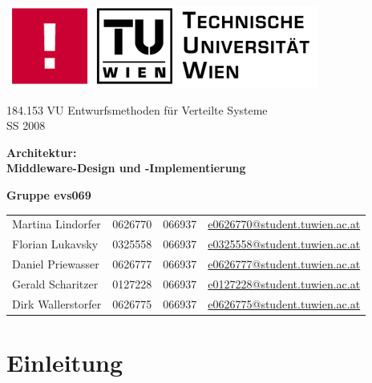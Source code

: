 \documentclass[a4paper,11pt]{article}
\begin{document}
\begin{titlepage}
	\bigskip
	\bigskip
	\bigskip
	\begin{center}
		\includegraphics{images/img_tuwien.png}
		
		\vspace{3cm}

		\LARGE{\textsf{184.153 VU Entwurfsmethoden f\"{u}r Verteilte Systeme\\SS 2008}}
			
		\vspace{1.5cm}
		\Huge{\textsf{\textbf{Architektur:\\}}}
		\LARGE{\textsf{\textbf{Middleware-Design und -Implementierung}}}
	\end{center}
	\vfill
	\begin{center}
		\large{\textsf{\textbf{Gruppe evs069}}}
	\end{center}
	\begin{tabular}{llll}
	\textsf{Martina Lindorfer}		& \textsf{0626770}	& \textsf{066937} & \url{e0626770@student.tuwien.ac.at} \\
	\textsf{Florian Lukavsky}		& \textsf{0325558}	& \textsf{066937} & \url{e0325558@student.tuwien.ac.at} \\
	\textsf{Daniel Priewasser}	& \textsf{0626777}	& \textsf{066937} & \url{e0626777@student.tuwien.ac.at}\\
	\textsf{Gerald Scharitzer}	& \textsf{0127228}	& \textsf{066937} & \url{e0127228@student.tuwien.ac.at}\\
	\textsf{Dirk Wallerstorfer}	& \textsf{0626775}	& \textsf{066937} & \url{e0626775@student.tuwien.ac.at}\\
	\end{tabular}
\end{titlepage}

\clearpage

\pagestyle{fancy}				
\fancyfoot{}

\tableofcontents
\newpage

\section*{Einleitung}
\end{document}
